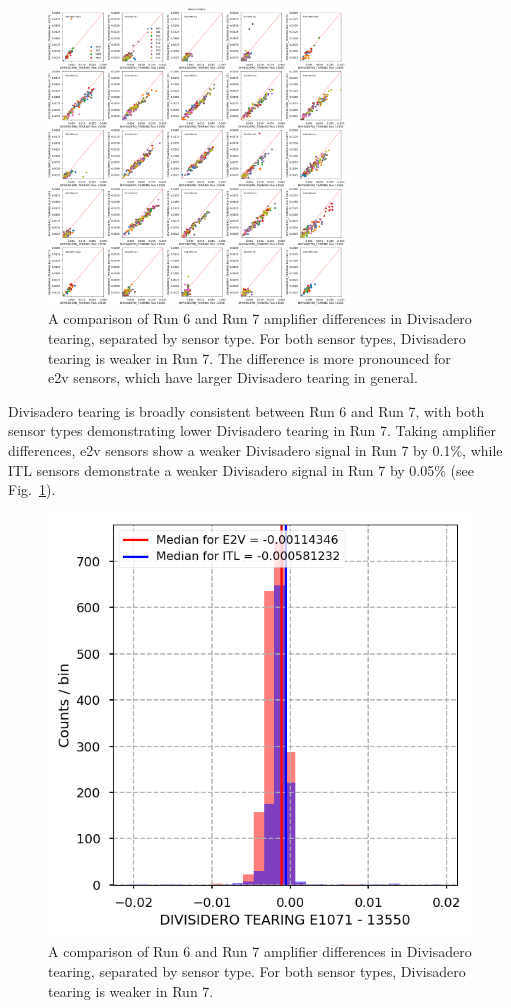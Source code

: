 \begin{figure}[H]
\begin{centering}
\includegraphics[width=0.7\textwidth]{figures/baselineCharacterization/13550_E1071_DIVISADERO_TEARING_inset.png}
\caption{A comparison of Run 6 and Run 7 amplifier differences in Divisadero tearing, separated by sensor type. For both sensor types, Divisadero tearing is weaker in Run 7. The difference is more pronounced for e2v sensors, which have larger Divisadero tearing in general.}
\end{centering}
\end{figure}

Divisadero tearing is broadly consistent between Run 6 and Run 7, with both sensor types demonstrating lower Divisadero tearing in Run 7. Taking amplifier differences, e2v sensors show a weaker Divisadero signal in Run 7 by 0.1\%, while ITL sensors demonstrate a weaker Divisadero signal in Run 7 by 0.05\% (see Fig.~\ref{fig:divisidero_diff_baseline}).

\begin{figure}[H]
    \centering
    \includegraphics[width=0.7\linewidth]{figures/baselineCharacterization/DIVISIDERO_TEARING_13550_E1071_diff.png}
    \caption{A comparison of Run 6 and Run 7 amplifier differences in Divisadero tearing, separated by sensor type. For both sensor types, Divisadero tearing is weaker in Run 7.}
    \label{fig:divisidero_diff_baseline}
\end{figure}

